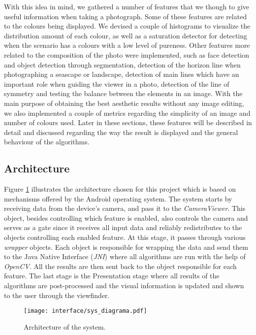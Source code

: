 With this idea in mind, we gathered a number of features that we though to give useful information when taking a photograph. Some of these features are related to the colours being displayed. We devised a couple of histograms to visualize the distribution amount of each colour, as well as a saturation detector for detecting when the scenario has a colours with a low level of pureness. Other features more related to the composition of the photo were implemented, such as face detection and object detection through segmentation, detection of the horizon line when photographing a seascape or landscape, detection of main lines which have an important role when guiding the viewer in a photo, detection of the line of symmetry and testing the balance between the elements in an image. With the main purpose of obtaining the best aesthetic results without any image editing, we also implemented a couple of metrics regarding the simplicity of an image and number of colours used. Later in these sections, these features will be described in detail and discussed regarding the way the result is displayed and the general behaviour of the algorithms.

\subsection{Architecture}

Figure \ref{fig:sys_diagram} illustrates the architecture chosen for this project which is based on mechanisms offered by the Android operating system. The system starts by receiving data from the device's camera, and pass it to the \emph{CameraViewer}. This object, besides controlling which feature is enabled, also controls the camera and serves as a gate since it receives all input data and reliably redistributes to the objects controlling each enabled feature. 
At this stage, it passes through various \emph{wrapper} objects. Each object is responsible for wrapping the data and send them to the Java Native Interface (\emph{JNI}) where all algorithms are run with the help of \emph{OpenCV}. All the results are then sent back to the object responsible for each feature. The last stage is the Presentation stage where all results of the algorithms are post-processed and the visual information is updated and shown to the user through the viewfinder.

\begin{figure}[htb]
	\centering
	\texttt{[image: interface/sys\_diagrama.pdf]}
	\caption{Architecture of the system.}
	\label{fig:sys_diagram}
\end{figure}

